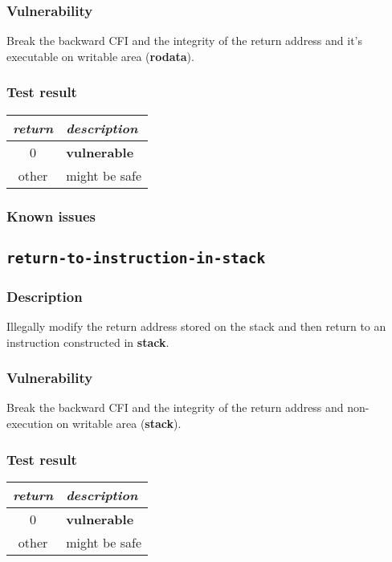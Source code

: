 \documentclass[a4paper]{book}
\begin{document}
\subsubsection{Vulnerability}
Break the backward CFI and the integrity of the return address and it’s  executable on writable area (\textbf{rodata}).

\subsubsection{Test result}
\begin{tabular}{cl}
  \toprule
  \emph{return}  & \emph{description} \\
  \midrule
  0              & \textbf{vulnerable} \\
  other          & might be safe \\
  \bottomrule
\end{tabular}
  
\subsubsection{Known issues}

\newpage
\subsection{\texttt{return-to-instruction-in-stack}}\label{test-return-to-instruction-in-stack}

\subsubsection{Description}
Illegally modify the return address stored on the stack and then return to  an instruction constructed in \textbf{stack}.

\subsubsection{Vulnerability}
Break the backward CFI and the integrity of the return address and non-execution on writable area (\textbf{stack}).

\subsubsection{Test result}
\begin{tabular}{cl}
  \toprule
  \emph{return}  & \emph{description} \\
  \midrule
  0              & \textbf{vulnerable} \\
  other          & might be safe \\
  \bottomrule
\end{tabular}
  
\end{document}
